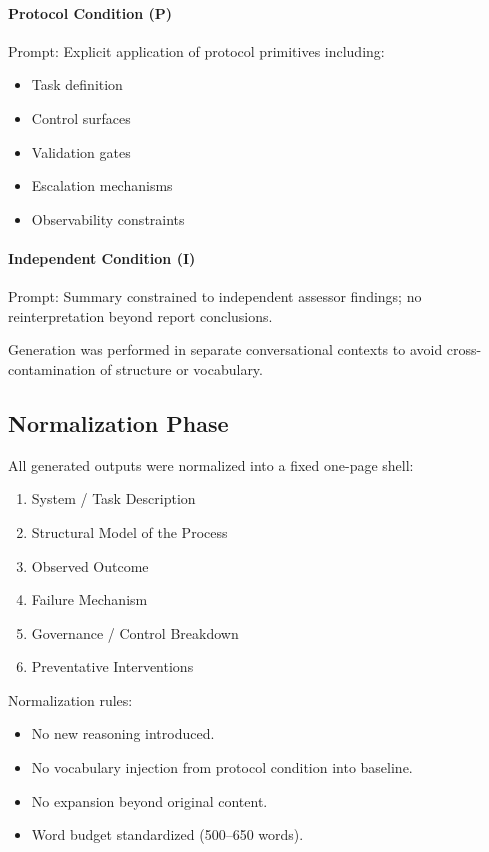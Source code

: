 \paragraph{Protocol Condition (P)}
Prompt: Explicit application of protocol primitives including:
\begin{itemize}
    \item Task definition
    \item Control surfaces
    \item Validation gates
    \item Escalation mechanisms
    \item Observability constraints
\end{itemize}

\paragraph{Independent Condition (I)}
Prompt: Summary constrained to independent assessor findings; no reinterpretation beyond report conclusions.

Generation was performed in separate conversational contexts to avoid cross-contamination of structure or vocabulary.

\subsection{Normalization Phase}

All generated outputs were normalized into a fixed one-page shell:

\begin{enumerate}
    \item System / Task Description
    \item Structural Model of the Process
    \item Observed Outcome
    \item Failure Mechanism
    \item Governance / Control Breakdown
    \item Preventative Interventions
\end{enumerate}

Normalization rules:
\begin{itemize}
    \item No new reasoning introduced.
    \item No vocabulary injection from protocol condition into baseline.
    \item No expansion beyond original content.
    \item Word budget standardized (500--650 words).
\end{itemize}

